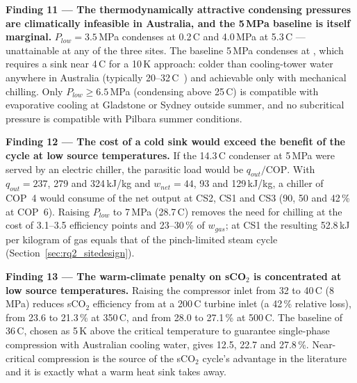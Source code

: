 \begin{findingbox}
\textbf{Finding 11 --- The thermodynamically attractive condensing pressures
are climatically infeasible in Australia, and the 5\,MPa baseline is itself
marginal.}
$P_{low} = 3.5$\,MPa condenses at 0.2\,\textdegree C and 4.0\,MPa at
5.3\,\textdegree C --- unattainable at any of the three sites. The baseline
5\,MPa condenses at , which requires a sink
near 4\,\textdegree C for a 10\,K approach: colder than cooling-tower water
anywhere in Australia (typically 20--32\,\textdegree C~\cite{BOM2024}) and
achievable only with mechanical chilling. Only $P_{low} \ge 6.5$\,MPa
(condensing above 25\,\textdegree C) is compatible with evaporative cooling
at Gladstone or Sydney outside summer, and no subcritical pressure is
compatible with Pilbara summer conditions.
\end{findingbox}

\begin{findingbox}
\textbf{Finding 12 --- The cost of a cold sink would exceed the benefit of
the cycle at low source temperatures.}
If the 14.3\,\textdegree C condenser at 5\,MPa were served by an electric
chiller, the parasitic load would be $q_{out}/\mathrm{COP}$. With
$q_{out} = 237$, 279 and 324\,kJ/kg and $w_{net} = 44$, 93 and 129\,kJ/kg,
a chiller of COP~4 would consume  of
the net output at CS2, CS1 and CS3 (90, 50 and 42\,\% at COP~6). Raising
$P_{low}$ to 7\,MPa (28.7\,\textdegree C) removes the need for chilling at
the cost of 3.1--3.5 efficiency points and 23--30\,\% of $w_{gas}$; at CS1
the resulting 52.8\,kJ per kilogram of gas equals that of the pinch-limited
steam cycle (Section~\ref{sec:rq2_sitedesign}).
\end{findingbox}

\begin{findingbox}
\textbf{Finding 13 --- The warm-climate penalty on sCO$_2$ is concentrated at
low source temperatures.}
Raising the compressor inlet from 32 to 40\,\textdegree C (8\,MPa) reduces
sCO$_2$ efficiency from  at a 200\,\textdegree C
turbine inlet (a 42\,\% relative loss), from 23.6 to 21.3\,\% at
350\,\textdegree C, and from 28.0 to 27.1\,\% at 500\,\textdegree C. The
baseline of 36\,\textdegree C, chosen as 5\,K above the critical temperature
to guarantee single-phase compression with Australian cooling water, gives
12.5, 22.7 and 27.8\,\%. Near-critical compression is the source of the
sCO$_2$ cycle's advantage in the literature and it is exactly what a warm heat
sink takes away.
\end{findingbox}

